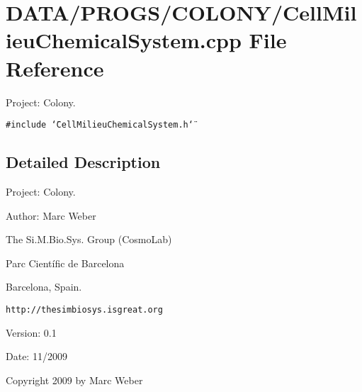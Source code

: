 \section{DATA/PROGS/COLONY/CellMilieuChemicalSystem.cpp File Reference}
\label{CellMilieuChemicalSystem_8cpp}
Project: Colony. 

{\tt \#include \char`\"{}CellMilieuChemicalSystem.h\char`\"{}}\par


\subsection{Detailed Description}
Project: Colony. 

\begin{Desc}
\item[Author:]Marc Weber\par
 The Si.M.Bio.Sys. Group (CosmoLab)\par
 Parc Científic de Barcelona\par
 Barcelona, Spain.\par
 {\tt http://thesimbiosys.isgreat.org} \end{Desc}
\begin{Desc}
\item[Version:]0.1 \end{Desc}
\begin{Desc}
\item[Date:]11/2009\end{Desc}
Copyright 2009 by Marc Weber 